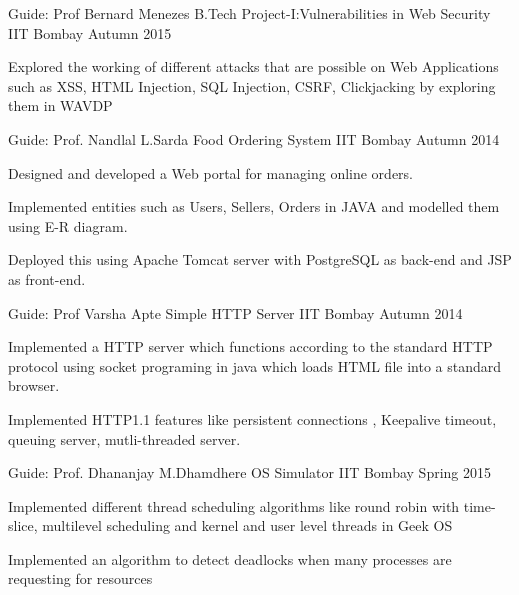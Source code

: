 \begin{cventries}
    
  \cventry
    {Guide: Prof Bernard Menezes}
    {B.Tech Project-I:Vulnerabilities in Web Security}
    {IIT Bombay}
    {Autumn 2015}
    {
      \begin{cvitems}
        \item {Explored the working of different attacks that are possible on Web Applications such as XSS, HTML
                Injection, SQL Injection, CSRF, Clickjacking by exploring them in WAVDP}
      \end{cvitems} 
    }
  \cventry
    {Guide: Prof. Nandlal L.Sarda}
    {Food Ordering System}
    {IIT Bombay}
    {Autumn 2014}
    {
      \begin{cvitems}
        \item {Designed and developed a Web portal for managing online orders.}
        \item{Implemented entities such as Users, Sellers, Orders in JAVA and modelled them using E-R diagram.}
        \item{Deployed this using Apache Tomcat server with PostgreSQL as back-end and JSP as front-end.}
      \end{cvitems}
    }
  \cventry
    {Guide: Prof Varsha Apte}
    {Simple HTTP Server}
    {IIT Bombay}
    {Autumn 2014}
    {
      \begin{cvitems}
        \item {Implemented a HTTP server which functions according to the standard HTTP protocol using socket
                programing in java which loads HTML file into a standard browser.}
        \item{Implemented HTTP1.1 features like persistent connections , Keepalive timeout, queuing server,
            mutli-threaded server.}
      \end{cvitems}
    }
  \cventry
    {Guide: Prof. Dhananjay M.Dhamdhere}
    {OS Simulator}
    {IIT Bombay}
    {Spring 2015}
    {
      \begin{cvitems}
        \item {Implemented different thread scheduling algorithms like round robin with time-slice, multilevel
                scheduling and kernel and user level threads in Geek OS}
        \item {Implemented an algorithm to detect deadlocks when many processes are requesting for resources}
      \end{cvitems}
}
\end{cventries}
